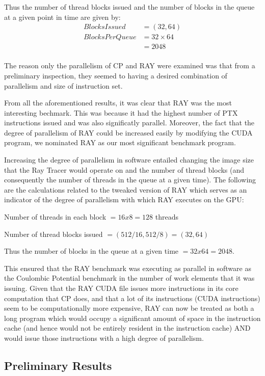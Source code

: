 Thus the number of thread blocks issued and the number of blocks in
the queue at a given point in time are given by:
\begin{align*}
BlocksIssued& = (32, 64)\\
BlocksPerQueue& = 32 \times 64\\& = 2048\\
\end{align*}

The reason only the parallelism of CP and RAY were examined was that
from a preliminary inspection, they seemed to having a desired
combination of parallelism and size of instruction set. 

From all the aforementioned results, it was clear that RAY was the
most interesting bechmark. 
This was because it had the highest number of PTX instructions issued
and was also significatly parallel. 
Moreover, the fact that the degree of parallelism of RAY could be
increased easily by modifying the CUDA program, we nominated RAY as
our most significant benchmark program.
 

Increasing the degree of parallelism in software entailed changing the
image size that the Ray Tracer would operate on and the number of
thread blocks (and consequently the number of threads in the queue at
a given time). 
The following are the calculations related to the tweaked version of RAY which serves as an indicator of the degree of parallelism with which RAY executes on the GPU:

Number of threads in each block $= 16 x 8 = 128$ threads

Number of thread blocks issued $= (512/16, 512/8) = (32, 64)$

Thus the number of blocks in the queue at a given time $= 32 x 64 = 2048.$

This ensured that the RAY benchmark was executing as parallel in
software as the Coulombic Potential benchmark in the number of work
elements that it was issuing. 
Given that the RAY CUDA file issues more instructions in its core
computation that CP does, and that a lot of its instructions (CUDA
instructions) seem to be computationally more expensive, RAY can now
be treated as both a long program which would occupy a significant
amount of space in the instruction cache (and hence would not be
entirely resident in the instruction cache) AND would issue those
instructions with a high degree of parallelism.

\subsection{Preliminary Results}

